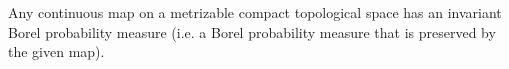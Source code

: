 \documentclass[12pt]{article}
\begin{document}
Any continuous map on a metrizable compact topological space has an invariant Borel probability measure (i.e. a Borel probability measure that is preserved by the given map).
\end{document}
